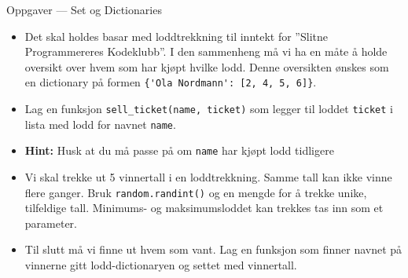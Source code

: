 \documentclass[screen, aspectratio=169]{beamer}
\begin{document}
\iffalse
\begin{frame}{Oppgaver - Dictionaries}
	\begin{itemize}
		\item<+-> Lag en dictionary: Prices, med nøklene ''banana'' =10, ''apple''=  5, ''grape''=  15, orange=25 
		
		\item<+-> Lag en funksjon, som tar inn en dictionary, en nøkkel, og en verdi, og oppdaterer dictionarien med den nye verdien
        \item<+-> Lag en funksjon som iterer gjennom dictionarien og printer ut hver nøkkel og verdi sammen med hverandre
		\item<+-> Skriv inn en funksjon, som tar inn en dictionary, og et tall - og returnerer alle nøklene i verdien, som du har råd til å kjøpe
        
		\item<+-> Lag en funksjon, som tar inn to dictionaries: En pris, og en ''handlekurv'' som ser slik ut: \lstinline|\{'apple': 2\}|. For alle tingene du har i handlekurven, finn ut total pris på alle varene dine, ved hjelp av pris-dictionaries
		

		\item<+-> Utvid funksjonen til å også ta inn en lager dictionary, med antall varer på lager. Funksjonen skal sjekke om det er nok varer på lager, kjøpe så mange som du har sagt i handlekurven, og redusere varelageret med så mange du kjøper

	\end{itemize}
\end{frame}
\fi

\begin{frame}[fragile]{Oppgaver --- Set og Dictionaries}
    \begin{itemize}
        \item Det skal holdes basar med loddtrekkning til inntekt for ''Slitne Programmereres Kodeklubb''. I den sammenheng må vi ha en måte å holde oversikt over hvem som har kjøpt hvilke lodd. Denne oversikten ønskes som en dictionary på formen \lstinline|{'Ola Nordmann': [2, 4, 5, 6]}|.
        \item Lag en funksjon \lstinline|sell_ticket(name, ticket)| som legger til loddet \lstinline|ticket| i lista med lodd for navnet \lstinline|name|.
        \item<2-> \textbf{Hint:} Husk at du må passe på om \lstinline|name| har kjøpt lodd tidligere
        \item<3-> Vi skal trekke ut 5 vinnertall i en loddtrekkning. Samme tall kan ikke vinne flere ganger. Bruk \lstinline|random.randint()| og en mengde for å trekke unike, tilfeldige tall. Minimums- og maksimumsloddet kan trekkes tas inn som et parameter.
        \item<4-> Til slutt må vi finne ut hvem som vant. Lag en funksjon som finner navnet på vinnerne gitt lodd-dictionaryen og settet med vinnertall.
    \end{itemize}
\end{frame}
\end{document}
